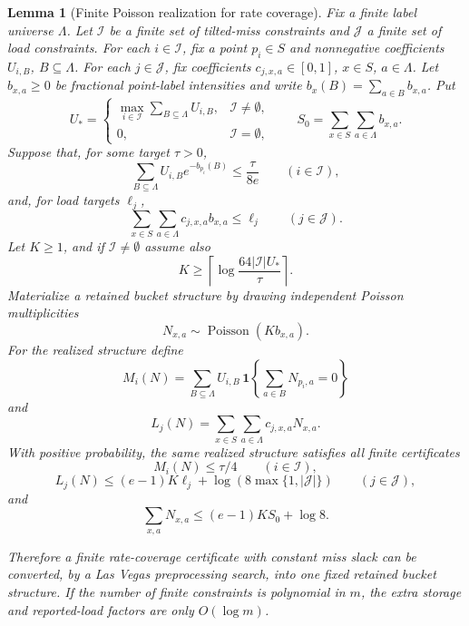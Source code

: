 \documentclass[10pt]{article}
\newtheorem{lemma}[theorem]{Lemma}
\theoremstyle{definition}
\begin{document}
\begin{lemma}[Finite Poisson realization for rate coverage]
   \label{lem:finite-poisson-rate-coverage-realization}
   Fix a finite label universe \(\Lambda\).  Let \(\mathcal I\) be a finite
   set of tilted-miss constraints and \(\mathcal J\) a finite set of load
   constraints.  For each \(i\in\mathcal I\), fix a point \(p_i\in S\) and
   nonnegative coefficients \(U_{i,B}\), \(B\subseteq\Lambda\).  For each
   \(j\in\mathcal J\), fix coefficients
   \(c_{j,x,a}\in[0,1]\), \(x\in S\), \(a\in\Lambda\).  Let
   \(b_{x,a}\ge0\) be fractional point-label intensities and write
   \(b_x(B)=\sum_{a\in B}b_{x,a}\).  Put
   \[
      U_*=
      \begin{cases}
      \max_{i\in\mathcal I}\sum_{B\subseteq\Lambda}U_{i,B},
      &\mathcal I\ne\emptyset,\\
      0,&\mathcal I=\emptyset,
      \end{cases}
      \qquad
      S_0=\sum_{x\in S}\sum_{a\in\Lambda}b_{x,a}.
   \]
   Suppose that, for some target \(\tau>0\),
   \[
      \sum_{B\subseteq\Lambda}U_{i,B}e^{-b_{p_i}(B)}
      \le
      \frac{\tau}{8e}
      \qquad(i\in\mathcal I),
      \tag{FR1}
   \]
   and, for load targets \(\ell_j\),
   \[
      \sum_{x\in S}\sum_{a\in\Lambda}c_{j,x,a}b_{x,a}
      \le \ell_j
      \qquad(j\in\mathcal J).
      \tag{FR2}
   \]
   Let \(K\ge1\), and if \(\mathcal I\ne\emptyset\) assume also
   \[
      K\ge
      \left\lceil
      \log\frac{64|\mathcal I|U_*}{\tau}
      \right\rceil .
      \tag{FR3}
   \]
   Materialize a
   retained bucket structure by drawing independent Poisson multiplicities
   \[
      N_{x,a}\sim\operatorname{Poisson}(K b_{x,a}).
   \]
   For the realized structure define
   \[
      M_i(N)=
      \sum_{B\subseteq\Lambda}
      U_{i,B}\,
      \mathbf 1\!\left\{\sum_{a\in B}N_{p_i,a}=0\right\}
      \tag{FR4}
   \]
   and
   \[
      L_j(N)=
      \sum_{x\in S}\sum_{a\in\Lambda}c_{j,x,a}N_{x,a}.
      \tag{FR5}
   \]
   With positive probability, the same realized structure satisfies all finite
   certificates
   \[
      M_i(N)\le\tau/4
      \qquad(i\in\mathcal I),
      \tag{FR6}
   \]
   \[
      L_j(N)\le (e-1)K\ell_j+\log(8\max\{1,|\mathcal J|\})
      \qquad(j\in\mathcal J),
      \tag{FR7}
   \]
   and
   \[
      \sum_{x,a}N_{x,a}\le(e-1)KS_0+\log 8 .
      \tag{FR8}
   \]

   Therefore a finite rate-coverage certificate with constant miss slack can be
   converted, by a Las Vegas preprocessing search, into one fixed retained
   bucket structure.  If the number of finite constraints is polynomial in
   \(m\), the extra storage and reported-load factors are only
   \(O(\log m)\).
\end{lemma}
\end{document}
